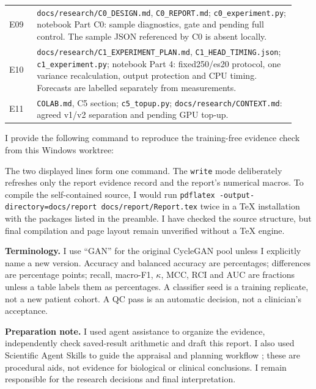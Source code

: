 \documentclass[11pt,a4paper]{article}
\newcommand{\file}[1]{\nolinkurl{#1}}
\newcommand{\pp}{percentage points}
\begin{document}
\begin{longtable}{>{\raggedright\arraybackslash}p{0.09\linewidth}
                  >{\raggedright\arraybackslash}p{0.84\linewidth}}
E09 & \file{docs/research/C0_DESIGN.md}, \file{C0_REPORT.md};
\file{c0_experiment.py}; notebook Part C0: sample diagnostics, gate and pending
full control. The sample JSON referenced by C0 is absent locally.\\
E10 & \file{docs/research/C1_EXPERIMENT_PLAN.md},
\file{C1_HEAD_TIMING.json}; \file{c1_experiment.py}; notebook Part 4:
fixed250/es20 protocol, one variance recalculation, output protection and CPU
timing. Forecasts are labelled separately from measurements.\\
E11 & \file{COLAB.md}, C5 section; \file{c5_topup.py};
\file{docs/research/CONTEXT.md}: agreed v1/v2 separation and pending GPU top-up.\\
\end{longtable}

I provide the following command to reproduce the training-free evidence check
from this Windows worktree:
\begin{quote}\small\ttfamily
{}\par
{}
\end{quote}
The two displayed lines form one command. The \texttt{write} mode deliberately
refreshes only the report evidence record and the report's numerical macros.
To compile the self-contained source, I would run \texttt{pdflatex -output-directory=docs/report docs/report/Report.tex}
twice in a TeX installation with the packages listed in the preamble.
I have checked the source structure, but final compilation and page layout
remain unverified without a TeX engine.

\textbf{Terminology.} I use ``GAN'' for the original CycleGAN pool unless I
explicitly name a new version. Accuracy and balanced accuracy are percentages;
differences are \pp; recall, macro-F1, $\kappa$, MCC, RCI and AUC are fractions
unless a table labels them as percentages. A classifier seed is a training
replicate, not a new patient cohort. A QC pass is an automatic decision,
not a clinician's acceptance.

\textbf{Preparation note.} I used agent assistance to organize the evidence,
independently check saved-result arithmetic and draft this report. I also used
Scientific Agent Skills to guide the appraisal and planning workflow
\cite{skills}; these are procedural aids, not evidence for biological or
clinical conclusions. I remain responsible for the research decisions and
final interpretation.
\end{document}
